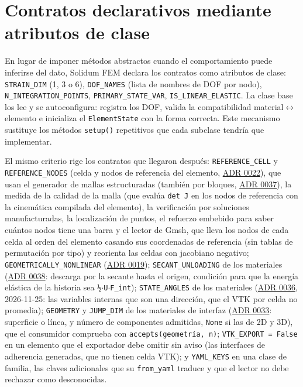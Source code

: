 \documentclass[11pt,oneside]{report}
\begin{document}
\section{Contratos declarativos mediante atributos de clase}

En lugar de imponer métodos abstractos cuando el comportamiento puede inferirse del dato, Solidum FEM declara los contratos como atributos de clase: \texttt{STRAIN\_DIM} (1, 3 o 6), \texttt{DOF\_NAMES} (lista de nombres de DOF por nodo), \texttt{N\_\allowbreak{}INTEGRATION\_\allowbreak{}POINTS}, \texttt{PRIMARY\_\allowbreak{}STATE\_\allowbreak{}VAR}, \texttt{IS\_\allowbreak{}LINEAR\_\allowbreak{}ELASTIC}. La clase base los lee y se autoconfigura: registra los DOF, valida la compatibilidad material\ensuremath{\leftrightarrow}elemento e inicializa el \texttt{ElementState} con la forma correcta. Este mecanismo sustituye los métodos \texttt{setup()} repetitivos que cada subclase tendría que implementar.

El mismo criterio rige los contratos que llegaron después: \texttt{REFERENCE\_CELL} y \texttt{REFERENCE\_NODES} (celda y nodos de referencia del elemento, \hyperref[adr:0022]{ADR 0022}), que usan el generador de mallas estructuradas (también por bloques, \hyperref[adr:0037]{ADR 0037}), la medida de la calidad de la malla (que evalúa \texttt{det J} en los nodos de referencia con la cinemática compilada del elemento), la verificación por soluciones manufacturadas, la localización de puntos, el refuerzo embebido para saber cuántos nodos tiene una barra y el lector de Gmsh, que lleva los nodos de cada celda al orden del elemento casando sus coordenadas de referencia (sin tablas de permutación por tipo) y reorienta las celdas con jacobiano negativo; \texttt{GEOMETRICALLY\_\allowbreak{}NONLINEAR} (\hyperref[adr:0019]{ADR 0019}); \texttt{SECANT\_UNLOADING} de los materiales (\hyperref[adr:0038]{ADR 0038}: descarga por la secante hasta el origen, condición para que la energía elástica de la historia sea \texttt{½\ensuremath{\cdot}U\ensuremath{\cdot}F\_int}); \texttt{STATE\_ANGLES} de los materiales (\hyperref[adr:0036]{ADR 0036}, 2026-11-25: las variables internas que son una dirección, que el VTK por celda no promedia); \texttt{GEOMETRY} y \texttt{JUMP\_DIM} de los materiales de interfaz (\hyperref[adr:0033]{ADR 0033}: superficie o línea, y número de componentes admitidas, \texttt{None} si las de 2D y 3D), que el consumidor comprueba con \texttt{accepts(geometría, n)}; \texttt{VTK\_\allowbreak{}EXPORT = False} en un elemento que el exportador debe omitir sin aviso (las interfaces de adherencia generadas, que no tienen celda VTK); y \texttt{YAML\_KEYS} en una clase de familia, las claves adicionales que su \texttt{from\_yaml} traduce y que el lector no debe rechazar como desconocidas.
\end{document}
